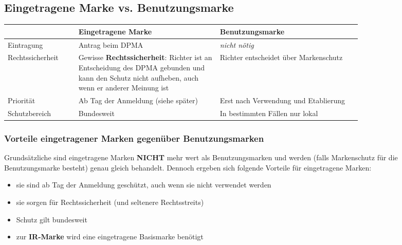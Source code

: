 \documentclass[12pt,A4]{extarticle}
\newcommand{\green}[1]{\textcolor{greenColor}{#1}}
\begin{document}
\subsection{Eingetragene Marke vs. Benutzungsmarke}
\bgroup
\def\arraystretch{1.5}
\begin{table}[h]
  \begin{tabular}{|l|p{0.4\linewidth}|p{0.4\linewidth}|}
    \hline
                     & Eingetragene Marke                                                                                                                                    & Benutzungsmarke                       \\ \hline
    Eintragung       & Antrag beim DPMA                                                                                                                                      & \textit{nicht nötig}                  \\ \hline
    Rechtssicherheit & Gewisse \textbf{Rechtssicherheit}: Richter ist an Entscheidung des DPMA gebunden und kann den Schutz nicht aufheben, auch wenn er anderer Meinung ist & Richter entscheidet über Markenschutz \\ \hline
    Priorität        & Ab Tag der Anmeldung (siehe später)                                                                                                                   & Erst nach Verwendung und Etablierung  \\ \hline
    Schutzbereich    & Bundesweit                                                                                                                                            & In bestimmten Fällen nur lokal        \\ \hline
  \end{tabular}
\end{table}
\egroup

\subsubsection{Vorteile eingetragener Marken gegenüber Benutzungsmarken}
Grundsätzliche sind eingetragene Marken \textbf{NICHT} mehr wert als Benutzungsmarken und werden (falls Markenschutz für die Benutzungsmarke besteht) genau gleich behandelt.
Dennoch ergeben sich folgende Vorteile für eingetragene Marken:
\begin{itemize}
  \item{sie sind \green{ab Tag der Anmeldung geschützt}, auch wenn sie nicht verwendet werden}
  \item{sie sorgen für \green{Rechtssicherheit} (und seltenere Rechtsstreits)}
  \item{Schutz gilt \green{bundesweit}}
  \item{zur \textbf{IR-Marke} wird eine eingetragene Basismarke benötigt}
\end{itemize}
\end{document}
